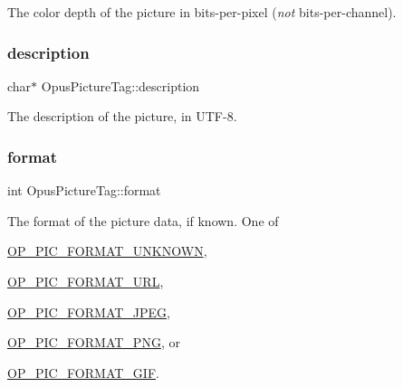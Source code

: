 The color depth of the picture in bits-\/per-\/pixel ({\itshape not} bits-\/per-\/channel). \mbox{\label{struct_opus_picture_tag_aa32d8bfcd831aa218b0de6d6af92dc08}} 
\subsubsection{\texorpdfstring{description}{description}}
{\footnotesize\ttfamily char$\ast$ Opus\+Picture\+Tag\+::description}

The description of the picture, in U\+T\+F-\/8. \mbox{\label{struct_opus_picture_tag_aba2d71a09ecf0999cf5faf7c2276fb37}} 
\subsubsection{\texorpdfstring{format}{format}}
{\footnotesize\ttfamily int Opus\+Picture\+Tag\+::format}

The format of the picture data, if known. One of 
\begin{DoxyItemize}
\item \hyperlink{group__header__info_gade2f09dce6330529fc3c96d1740df653}{O\+P\+\_\+\+P\+I\+C\+\_\+\+F\+O\+R\+M\+A\+T\+\_\+\+U\+N\+K\+N\+O\+WN}, 
\item \hyperlink{group__header__info_gaac4ef30a33caf090b9b1a5ada8f48204}{O\+P\+\_\+\+P\+I\+C\+\_\+\+F\+O\+R\+M\+A\+T\+\_\+\+U\+RL}, 
\item \hyperlink{group__header__info_gaf75ae037b78a4a048359261439395450}{O\+P\+\_\+\+P\+I\+C\+\_\+\+F\+O\+R\+M\+A\+T\+\_\+\+J\+P\+EG}, 
\item \hyperlink{group__header__info_ga703554b177ae75bd6999bbd30d485d3f}{O\+P\+\_\+\+P\+I\+C\+\_\+\+F\+O\+R\+M\+A\+T\+\_\+\+P\+NG}, or 
\item \hyperlink{group__header__info_gaa7d5e8cb675cb2da840f258b761e7781}{O\+P\+\_\+\+P\+I\+C\+\_\+\+F\+O\+R\+M\+A\+T\+\_\+\+G\+IF}. 
\end{DoxyItemize}\mbox{\label{struct_opus_picture_tag_a2de29a7eef41d13031c70786665eb638}} 
